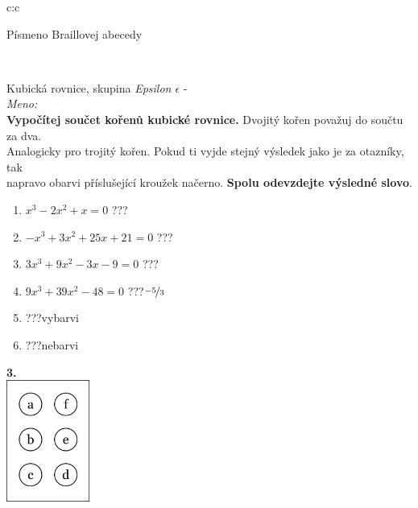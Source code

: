 \documentclass[10pt]{report}
\begin{document}
\begin{tabular}{c:c}
\begin{minipage}[c][99mm][t]{0.49\linewidth}
\begin{center}
\begin{minipage}{0.20\linewidth}
\begin{center}
{\small Písmeno Braillovej abecedy}
\end{center}
\end{minipage}
\end{center}
\end{minipage}
\\ \hdashline
\begin{minipage}[c][99mm][t]{0.49\linewidth}
\begin{center}
\vspace{7mm}
{\huge Kubická rovnice, skupina \textit{Epsilon $\epsilon$} -}\\[4.5mm]
\textit{Meno:}\phantom{xxxxxxxxxxxxxxxxxxxxxxxxxxxxxxxxxxxxxxxxxxxxxxxxxxxxxxxxxxxxxxxxx}\\[3.5mm]
\textbf{Vypočítej součet kořenů kubické rovnice.} Dvojitý kořen považuj do součtu za dva.\\Analogicky pro trojitý kořen. Pokud ti vyjde stejný výsledek jako je za otazníky, tak\\napravo obarvi příslušející kroužek načerno. \textbf{Spolu odevzdejte výsledné slovo}.\\[3mm]
\begin{minipage}{0.77\linewidth}
\begin{center}
\begin{varwidth}{\textwidth}
\begin{enumerate}
\large
\item $x^3-2x^2+x=0$\quad \dotfill\; ???\;\dotfill {}
\item $-x^3+3x^2+25x+21=0$\quad \dotfill\; ???\;\dotfill {}
\item $3x^3+9x^2-3x-9=0$\quad \dotfill\; ???\;\dotfill {}
\item $9x^3+39x^2-48=0$\quad \dotfill\; ???\;\dotfill \quad $\nicefrac{-5}{3}$
\item \quad \dotfill\; ???\;\dotfill \quad vybarvi
\item \quad \dotfill\; ???\;\dotfill \quad nebarvi
\end{enumerate}
\end{varwidth}
\end{center}
\end{minipage}
\begin{minipage}{0.20\linewidth}
\begin{center}
{\Huge\bfseries 3.} \\[2mm]
\includegraphics[height=40mm]{../images/braille.png}

\end{center}
\end{minipage}
\end{center}
\end{minipage}
\end{tabular}
\end{document}
